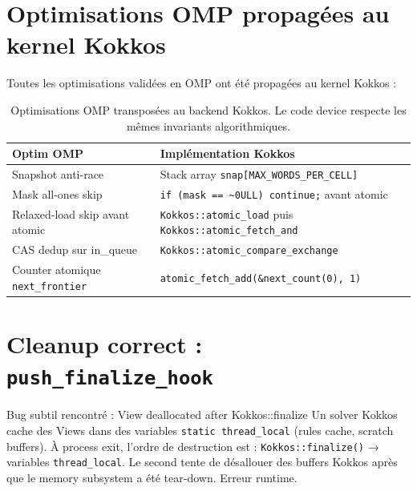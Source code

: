 \section{Optimisations OMP propagées au kernel Kokkos}
\label{sec:kokkos:propagated}

Toutes les optimisations validées en OMP ont été propagées au kernel Kokkos :

\begin{table}[H]
\centering
\begin{tabularx}{\textwidth}{lX}
\toprule
\textbf{Optim OMP} & \textbf{Implémentation Kokkos} \\
\midrule
Snapshot anti-race & Stack array \texttt{snap[MAX\_WORDS\_PER\_CELL]} \\
\midrule
Mask all-ones skip & \texttt{if (mask == \textasciitilde{}0ULL) continue;} avant atomic \\
\midrule
Relaxed-load skip avant atomic & \texttt{Kokkos::atomic\_load} puis \texttt{Kokkos::atomic\_fetch\_and} \\
\midrule
CAS dedup sur in\_queue & \texttt{Kokkos::atomic\_compare\_exchange} \\
\midrule
Counter atomique \texttt{next\_frontier} & \texttt{atomic\_fetch\_add(\&next\_count(0), 1)} \\
\bottomrule
\end{tabularx}
\caption{Optimisations OMP transposées au backend Kokkos. Le code device respecte les mêmes invariants algorithmiques.}
\label{tab:kokkos:optims}
\end{table}

\section{Cleanup correct : \texttt{push\_finalize\_hook}}
\label{sec:kokkos:cleanup}

\begin{important}{Bug subtil rencontré : View deallocated after Kokkos::finalize}
Un solver Kokkos cache des Views dans des variables \texttt{static thread\_local} (rules cache, scratch buffers). À process exit, l'ordre de destruction est : \texttt{Kokkos::finalize()} → variables \texttt{thread\_local}. Le second tente de désallouer des buffers Kokkos après que le memory subsystem a été tear-down. Erreur runtime.
\end{important}


